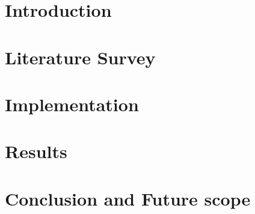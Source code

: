 \documentclass[a4paper, 12pt, oneside, BCOR1cm,toc=chapterentrywithdots]{scrbook}
\begin{document}
\onecolumn

\chapter{Introduction}

\chapter{Literature Survey}


\chapter{Implementation}


\chapter{Results}


\chapter{Conclusion and Future scope}






\end{document}
